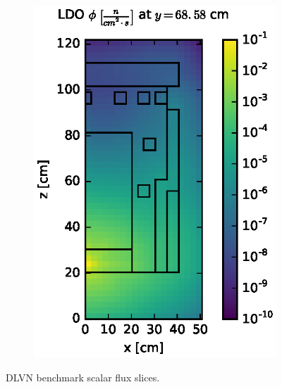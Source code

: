 \documentclass{article} %
\begin{document}
\begin{figure}[!htb]
\begin{subfigure}{0.4\textwidth}
\includegraphics[max height=0.445\textheight]
{img/dlvn-fwd-flux-ldo11.eps}
\end{subfigure}
\caption{DLVN benchmark scalar flux slices.}
\label{dlvn-fwd-slices}
\end{figure}
\end{document}
